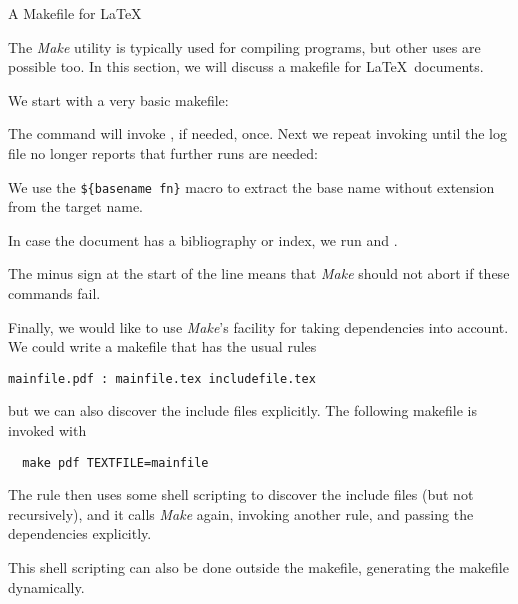  {A Makefile for \LaTeX}
\label{sec:latex-make}

The \emph{Make} utility is typically used for compiling programs, but
other uses are possible too. In this section, we will discuss a
makefile for \LaTeX\ documents.

We start with a very basic makefile:

The command  will invoke ,
if needed, once. Next we repeat invoking  until the log file no
longer reports that further runs are needed:

We use the \verb+${basename fn}+ macro to extract the base name
without extension from the target name.

In case the document has a bibliography or index, we run 
and . 

The minus sign at the start of the line means that
\emph{Make} should not abort if these commands fail.

Finally, we would like to use \emph{Make}'s facility for taking
dependencies into account. 
We could write a makefile that has
the usual rules
\begin{verbatim}
mainfile.pdf : mainfile.tex includefile.tex
\end{verbatim}
but we can also discover the include files explicitly. The following
makefile is invoked with 
\begin{verbatim}
  make pdf TEXTFILE=mainfile
\end{verbatim}
The  rule then uses some shell scripting to discover the
include files (but not recursively), and it calls \emph{Make} again,
invoking another rule, and passing the dependencies explicitly.

This shell scripting can also be done outside the makefile, generating
the makefile dynamically.

